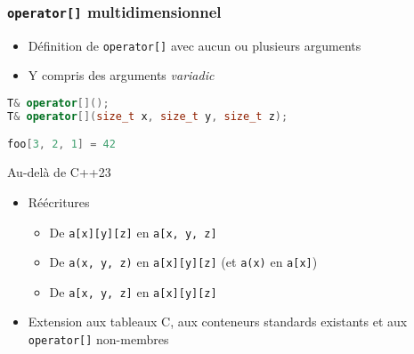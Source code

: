 \documentclass[C++.tex]{subfiles}
\begin{document}
\begin{frame}[fragile]
	\frametitle{\lstinline|operator[]| multidimensionnel}
	\begin{itemize}
		\item Définition de \lstinline|operator[]| avec aucun ou plusieurs arguments
		\item Y compris des arguments \textit{variadic}
	\end{itemize}

	\begin{lstlisting}[language=C++]
T& operator[]();
T& operator[](size_t x, size_t y, size_t z);

foo[3, 2, 1] = 42\end{lstlisting}


	\begin{block}{Au-delà de C++23}
		\begin{itemize}
			\item Réécritures
			\begin{itemize}
				\item De \lstinline|a[x][y][z]| en \lstinline|a[x, y, z]|
				\item De \lstinline|a(x, y, z)| en \lstinline|a[x][y][z]| (et  \lstinline|a(x)| en \lstinline|a[x]|)
				\item De \lstinline|a[x, y, z]| en \lstinline|a[x][y][z]|
			\end{itemize}
			\item Extension aux tableaux C, aux conteneurs standards existants et aux \lstinline|operator[]| non-membres
		\end{itemize}
	\end{block}


\end{frame}
\end{document}
